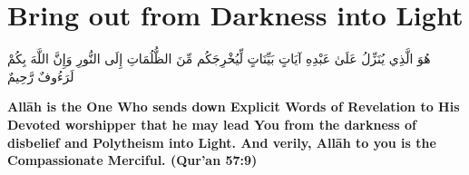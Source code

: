 \chapter{Bring out from Darkness into Light}
\begin{center}
    {\Huge    
        \begin{Arabic}
            هُوَ الَّذِي يُنَزِّلُ عَلَىٰ عَبْدِهِ آيَاتٍ بَيِّنَاتٍ لِّيُخْرِجَكُم مِّنَ الظُّلُمَاتِ إِلَى النُّورِ وَإِنَّ اللَّهَ بِكُمْ لَرَءُوفٌ رَّحِيمٌ
        \end{Arabic}
    }
\end{center}
\vspace*{\fill}
\vspace{3cm}
\begin{center}
    \large \textbf{Allāh is the One Who sends down Explicit Words of Revelation to His Devoted worshipper that he may lead You from the darkness of disbelief and Polytheism into Light. And verily, Allāh to you is the Compassionate Merciful. (Qur'an 57:9)}
\end{center}
